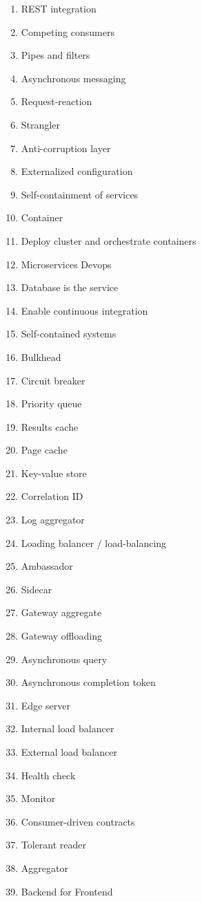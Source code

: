 \documentclass{article}
\theoremstyle{mytheoremstyle}
\theoremstyle{mytheoremstyle}
\theoremstyle{myproblemstyle}
\begin{document}
\begin{enumerate}
  \item REST integration 
  \item Competing consumers 
  \item Pipes and filters 
  \item Asynchronous messaging 
  \item Request-reaction 
  \item Strangler 
  \item Anti-corruption layer 
  \item Externalized configuration 
  \item Self-containment of services
  \item Container 
  \item Deploy cluster and orchestrate containers 
  \item Microservices Devops 
  \item Database is the service
  \item Enable continuous integration 
  \item Self-contained systems 
  \item Bulkhead 
  \item Circuit breaker 
  \item Priority queue 
  \item Results cache 
  \item Page cache 
  \item Key-value store 
  \item Correlation ID 
  \item Log aggregator 
  \item Loading balancer / load-balancing  
  \item Ambassador 
  \item Sidecar 
  \item Gateway aggregate 
  \item Gateway offloading 
  \item Asynchronous query 
  \item Asynchronous completion token 
  \item Edge server 
  \item Internal load balancer 
  \item External load balancer 
  \item Health check 
  \item Monitor 
  \item Consumer-driven contracts 
  \item Tolerant reader 
  \item Aggregator 
  \item Backend for Frontend 

\end{enumerate}
\end{document}
